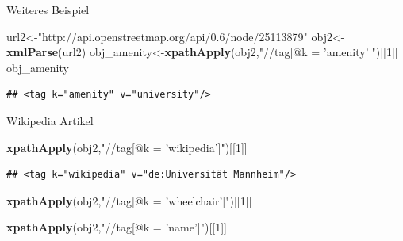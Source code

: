 \documentclass[ignorenonframetext,]{beamer}
\newenvironment{Shaded}{\begin{snugshade}}{\end{snugshade}}
\newcommand{\DecValTok}[1]{\textcolor[rgb]{0.27,0.67,0.26}{#1}}
\newcommand{\KeywordTok}[1]{\textcolor[rgb]{0.26,0.66,0.93}{\textbf{#1}}}
\newcommand{\NormalTok}[1]{\textcolor[rgb]{0.74,0.68,0.62}{#1}}
\newcommand{\StringTok}[1]{\textcolor[rgb]{0.02,0.61,0.04}{#1}}
\begin{document}
\begin{frame}[fragile]{Weiteres Beispiel}
\protect\hypertarget{weiteres-beispiel}{}

\begin{Shaded}
\begin{Highlighting}[]
\NormalTok{url2<-}\StringTok{"http://api.openstreetmap.org/api/0.6/node/25113879"}
\NormalTok{obj2<-}\KeywordTok{xmlParse}\NormalTok{(url2)}
\NormalTok{obj_amenity<-}\KeywordTok{xpathApply}\NormalTok{(obj2,}\StringTok{"//tag[@k = 'amenity']"}\NormalTok{)[[}\DecValTok{1}\NormalTok{]]}
\NormalTok{obj_amenity}
\end{Highlighting}
\end{Shaded}

\begin{verbatim}
## <tag k="amenity" v="university"/>
\end{verbatim}

\end{frame}

\begin{frame}[fragile]{Wikipedia Artikel}
\protect\hypertarget{wikipedia-artikel}{}

\begin{Shaded}
\begin{Highlighting}[]
\KeywordTok{xpathApply}\NormalTok{(obj2,}\StringTok{"//tag[@k = 'wikipedia']"}\NormalTok{)[[}\DecValTok{1}\NormalTok{]]}
\end{Highlighting}
\end{Shaded}

\begin{verbatim}
## <tag k="wikipedia" v="de:Universität Mannheim"/>
\end{verbatim}

\begin{Shaded}
\begin{Highlighting}[]
\KeywordTok{xpathApply}\NormalTok{(obj2,}\StringTok{"//tag[@k = 'wheelchair']"}\NormalTok{)[[}\DecValTok{1}\NormalTok{]]}
\end{Highlighting}
\end{Shaded}

\begin{Shaded}
\begin{Highlighting}[]
\KeywordTok{xpathApply}\NormalTok{(obj2,}\StringTok{"//tag[@k = 'name']"}\NormalTok{)[[}\DecValTok{1}\NormalTok{]]}
\end{Highlighting}
\end{Shaded}

\end{frame}
\end{document}

